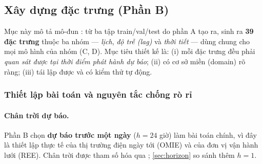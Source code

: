 \subsection{Xây dựng đặc trưng (Phần B)}\label{sec:features}

Mục này mô tả mô-đun : từ ba tập train/val/test do phần A tạo ra, sinh ra
\textbf{39 đặc trưng} thuộc ba nhóm --- \emph{lịch}, \emph{độ trễ (lag)} và \emph{thời tiết} --- dùng chung
cho mọi mô hình của nhóm (C, D). Mục tiêu thiết kế là: (i) mỗi đặc trưng đều phải \emph{quan sát được tại
thời điểm phát hành dự báo}; (ii) có cơ sở miền (domain) rõ ràng; (iii) tái lập được và có kiểm thử tự động.

\subsubsection{Thiết lập bài toán và nguyên tắc chống rò rỉ}\label{sec:setup}

\paragraph{Chân trời dự báo.} Phần B chọn \textbf{dự báo trước một ngày} ($h=24$ giờ) làm bài toán chính,
vì đây là thiết lập thực tế của thị trường điện ngày tới (OMIE) và của đơn vị vận hành lưới (REE). Chân trời
được tham số hóa qua ; \cref{sec:horizon} so sánh thêm $h=1$.

